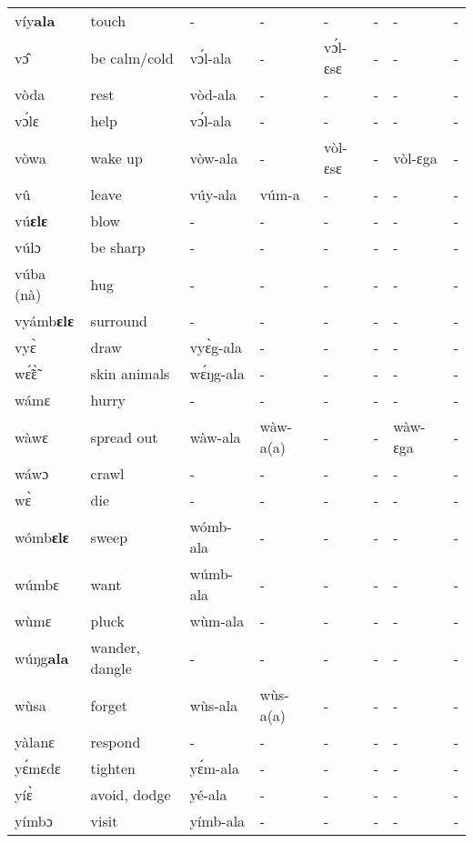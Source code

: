 \begin{sidewaystable}
\begin{longtable}{lp{3.5cm}llllll}
víy{\bfseries ala} & touch & -  & - & - & - & - & - \\
vɔ̂ & be calm/cold & vɔ́l-ala & - & vɔ́l-ɛsɛ & - & - & - \\
vòda & rest & vòd-ala & - & - & - & - & - \\
vɔ́lɛ & help & vɔ́l-ala & - & - & - & - & - \\
vòwa & wake up & vòw-ala & - & vòl-ɛsɛ & - &  vòl-ɛga & - \\
vû & leave & vúy-ala & vúm-a & - & - & - & - \\
vú{\bfseries ɛlɛ} & blow & - & - & - & - & - & - \\
vúlɔ & be sharp & - & - & - & - & - & - \\
vúba (nà) & hug & - & - & - & - & - & - \\
 vyámb{\bfseries ɛlɛ} & surround & - & - & - & - & - & - \\
vyɛ̀ & draw & vyɛ̀g-ala & - & - & -  & - & - \\
wɛ̃́ɛ̃̀ & skin animals & wɛ́ŋg-ala & - & - & - & - & - \\
wámɛ & hurry & - & - & - & - & - & - \\
wàwɛ & spread out & wàw-ala & wàw-a(a) & - & - & wàw-ɛga & - \\
wáwɔ & crawl & - & - &  - & - & - & - \\
wɛ̀ & die & - & - &  - & - & - & - \\
wómb{\bfseries ɛlɛ} & sweep & wómb-ala & - & - & - & - & - \\
wúmbɛ & want & wúmb-ala & - & - & -  & - & - \\
wùmɛ & pluck & wùm-ala & - & - & -  & - & - \\
wúŋg{\bfseries ala} & wander, dangle & - & - & - & - & - & - \\
wùsa & forget & wùs-ala & wùs-a(a) & - & - & - & - \\
yàlanɛ & respond & - & - & - & - & - & - \\
yɛ́mɛdɛ & tighten & yɛ́m-ala  & - & - & - & - & - \\
yíɛ̀ & avoid, dodge & yé-ala & - & - & - & - & - \\
yímbɔ & visit & yímb-ala & - & - & - & - & - \\
 \midrule
\end{longtable}

\end{sidewaystable}



